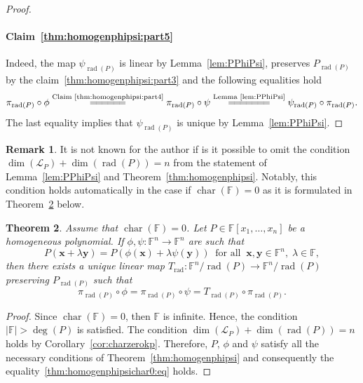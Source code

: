 \documentclass{elsarticle}
\DeclareMathOperator{\Char}{char}
\DeclareMathOperator{\rad}{rad}
\def\F{{\mathbb F}}
\newtheorem{theorem}{Theorem}[section]
\theoremstyle{definition}
\newtheorem{remark}[theorem]{Remark}
\numberwithin{equation}{section}
\begin{document}
\begin{proof}
\paragraph{Claim~\ref{thm:homogenphipsi:part5}}%
Indeed, the map $\psi_{\rad(P)}$ is linear by Lemma~\ref{lem:PPhiPsi}, preserves $P_{\rad(P)}$ by the claim~\ref{thm:homogenphipsi:part3} and the following equalities hold
\[
\pi_{\rad(P)} \circ \phi 
\overset{\scriptsize\mbox{Claim~\ref{thm:homogenphipsi:part4}}}{=\joinrel=\joinrel=\joinrel=\joinrel=\joinrel=}
\pi_{\rad(P)} \circ \psi
\overset{\scriptsize\mbox{Lemma~\ref{lem:PPhiPsi}}}{=\joinrel=\joinrel=\joinrel=\joinrel=\joinrel=\joinrel=}
\psi_{\rad(P)} \circ \pi_{\rad(P)}. 
\]
The last equality implies that $\psi_{\rad(P)}$ is unique by Lemma~\ref{lem:PPhiPsi}.
\end{proof}

\begin{remark}\label{rem:replacingCond}It is not known for the author if is it possible to omit the condition  $\dim (\mathcal L_P) + \dim (\rad(P)) = n$ from the statement of Lemma~\ref{lem:PPhiPsi} and Theorem~\ref{thm:homogenphipsi}. Notably, this condition holds automatically in the case if $\Char (\F) = 0$ as it is formulated in Theorem~\ref{thm:homogenphipsichar0} below. 
\end{remark}

\begin{theorem}\label{thm:homogenphipsichar0}Assume that $\Char(\F) = 0$. Let $P \in \F[x_1,\ldots, x_n]$ be a homogeneous polynomial. If  $\phi, \psi \colon \F^n \to \F^n$ are such that
\begin{equation*}
P(\mathbf{x} + \lambda \mathbf{y}) = P(\phi(\mathbf{x}) + \lambda \psi(\mathbf{y}))\;\;\mbox{for all}\;\;\mathbf{x},\mathbf{y} \in \mathbb \F^n,\; \lambda \in \F,
\end{equation*}
then there exists a unique linear map  $T_{\rad} \colon \F^n/\rad(P) \to \F^n/\rad(P)$ preserving $P_{\rad(P)}$ such that
\begin{equation}\label{thm:homogenphipsichar0:eq}
\pi_{\rad(P)} \circ \phi = \pi_{\rad(P)} \circ \psi = T_{\rad(P)} \circ \pi_{\rad(P)}. 
\end{equation}
\end{theorem} 
\begin{proof}Since $\Char(\F) = 0$, then $\F$ is infinite. Hence, the condition $|\F| > \deg(P)$ is satisfied. The condition $\dim (\mathcal L_P) + \dim (\rad(P)) = n$ holds by Corollary~\ref{cor:charzerokp}. Therefore, $P$, $\phi$ and $\psi$ satisfy all the necessary conditions of Theorem~\ref{thm:homogenphipsi} and consequently the equality~\eqref{thm:homogenphipsichar0:eq} holds.
\end{proof}
\end{document}
